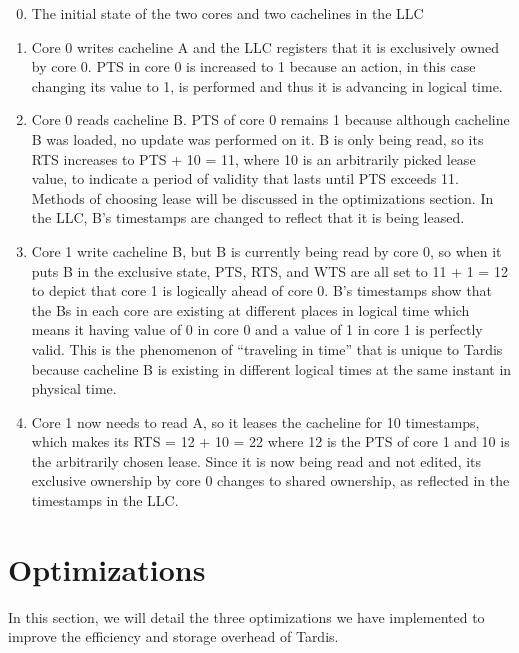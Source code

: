 \documentclass[12pt]{article}
\begin{document}
\begin{enumerate}
\setcounter{enumi}{-1}
	
\item The initial state of the two cores and two cachelines in the LLC

\item Core 0 writes cacheline A and the LLC registers that it is 
exclusively owned by core 0. PTS in core 0 is increased to 1 because 
an action, in this case changing its value to 1, is performed and thus 
it is advancing in logical time.  

\item Core 0 reads cacheline B. PTS of core 0 remains 1 because 
although cacheline B was loaded, no update was performed on it. B is 
only being read, so its RTS increases to PTS + 10 = 11, where 10 is an 
arbitrarily picked lease value, to indicate a period of validity that 
lasts until PTS exceeds 11. Methods of choosing lease will be 
discussed in the optimizations section. In the LLC, B’s timestamps are 
changed to reflect that it is being leased.

\item Core 1 write cacheline B, but B is currently being read by core 
0, so when it puts B in the exclusive state, PTS, RTS, and WTS are all 
set to 11 + 1 = 12 to depict that core 1 is logically ahead of core 0.  
B’s timestamps show that the Bs in each core are existing at different 
places in logical time which means it having value of 0 in core 0 and 
a value of 1 in core 1 is perfectly valid.  This is the phenomenon of 
``traveling in time'' that is unique to Tardis because cacheline B is 
existing in different logical times at the same instant in physical 
time.  

\item Core 1 now needs to read A, so it leases the cacheline for 10 
timestamps, which makes its RTS = 12 + 10 = 22 where 12 is the PTS of 
core 1 and 10 is the arbitrarily chosen lease. Since it is now being 
read and not edited, its exclusive ownership by core 0 changes to 
shared ownership, as reflected in the timestamps in the LLC.
\end{enumerate}

\section{Optimizations} \label{sec:optimization}

In this section, we will detail the three optimizations we have 
implemented to improve the efficiency and storage overhead of Tardis.
\end{document}
